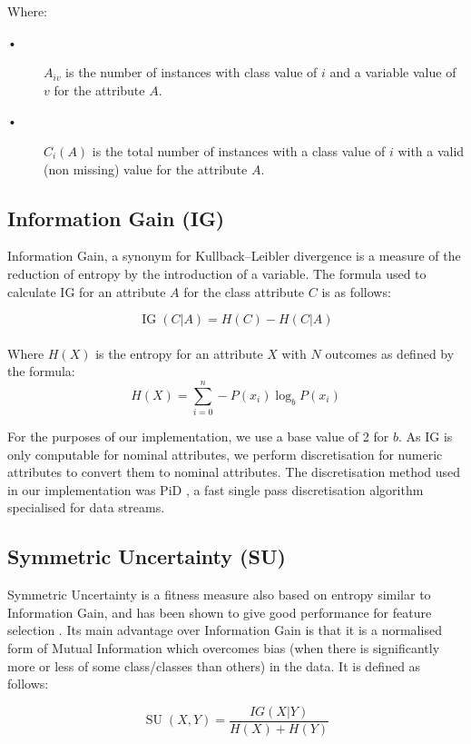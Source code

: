 Where: \begin{description}
\item[•]
$A_{i v}$ is the number of instances with class value of $i$ and a variable value of $v$ for the attribute $A$.
\item[•]
$C_{i}(A)$ is the total number of instances with a class value of $i$ with a valid (non missing) value for the attribute $A$.
\end{description}\medskip

\subsection{Information Gain (IG)}
Information Gain, a synonym for Kullback–Leibler divergence \citep{kullback1951} is a measure of the reduction of entropy by the introduction of a variable. The formula used to calculate IG for an attribute $A$ for the class attribute $C$ is as follows:

\begin{equation}
\operatorname{IG}(C|A) = H(C) - H(C|A)
\end{equation}\\
Where $H(X)$ is the entropy for an attribute $X$ with $N$ outcomes as defined by the formula:
\begin{equation}
H(X) = \sum_{i=0}^{n} -P(x_{i}) \log_{b} P(x_{i})
\end{equation}

For the purposes of our implementation, we use a base value of 2 for $b$. As IG is only computable for nominal attributes, we perform discretisation for numeric attributes to convert them to nominal attributes. The discretisation method used in our implementation was PiD \citep{Gama:2006:DDS:1141277.1141429}, a fast single pass discretisation algorithm specialised for data streams.

\subsection{Symmetric Uncertainty (SU)}
Symmetric Uncertainty is a fitness measure also based on entropy similar to Information Gain, and has been shown to give good performance for feature selection \citep{icml2003_YuL03}. Its main advantage over Information Gain is that it is a normalised form of Mutual Information which overcomes bias (when there is significantly more or less of some class/classes than others) in the data. It is defined as follows:

\begin{equation}
\operatorname{SU}(X,Y) = \frac{IG(X|Y)}{H(X) + H(Y)}
\end{equation} 

